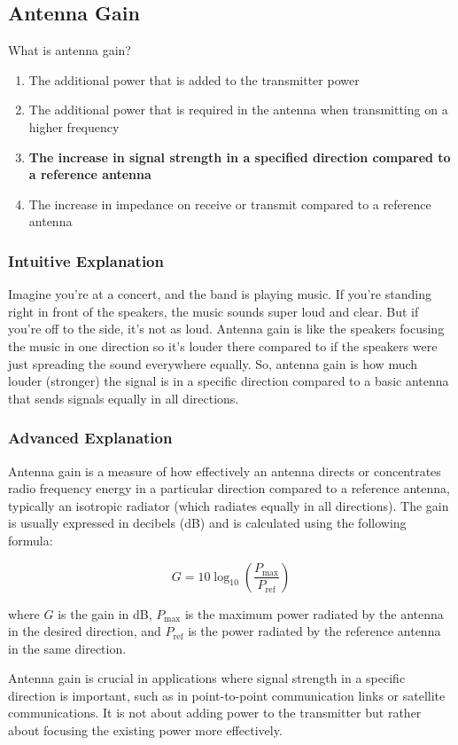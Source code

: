 \subsection{Antenna Gain}
\label{T9A11}

\begin{tcolorbox}[colback=gray!10!white,colframe=black!75!black,title=T9A11]
What is antenna gain?  
\begin{enumerate}[label=\Alph*)]
    \item The additional power that is added to the transmitter power
    \item The additional power that is required in the antenna when transmitting on a higher frequency
    \item \textbf{The increase in signal strength in a specified direction compared to a reference antenna}
    \item The increase in impedance on receive or transmit compared to a reference antenna
\end{enumerate}
\end{tcolorbox}

\subsubsection{Intuitive Explanation}
Imagine you’re at a concert, and the band is playing music. If you’re standing right in front of the speakers, the music sounds super loud and clear. But if you’re off to the side, it’s not as loud. Antenna gain is like the speakers focusing the music in one direction so it’s louder there compared to if the speakers were just spreading the sound everywhere equally. So, antenna gain is how much louder (stronger) the signal is in a specific direction compared to a basic antenna that sends signals equally in all directions.

\subsubsection{Advanced Explanation}
Antenna gain is a measure of how effectively an antenna directs or concentrates radio frequency energy in a particular direction compared to a reference antenna, typically an isotropic radiator (which radiates equally in all directions). The gain is usually expressed in decibels (dB) and is calculated using the following formula:

\[
G = 10 \log_{10} \left( \frac{P_{\text{max}}}{P_{\text{ref}}} \right)
\]

where \( G \) is the gain in dB, \( P_{\text{max}} \) is the maximum power radiated by the antenna in the desired direction, and \( P_{\text{ref}} \) is the power radiated by the reference antenna in the same direction.

Antenna gain is crucial in applications where signal strength in a specific direction is important, such as in point-to-point communication links or satellite communications. It is not about adding power to the transmitter but rather about focusing the existing power more effectively.

